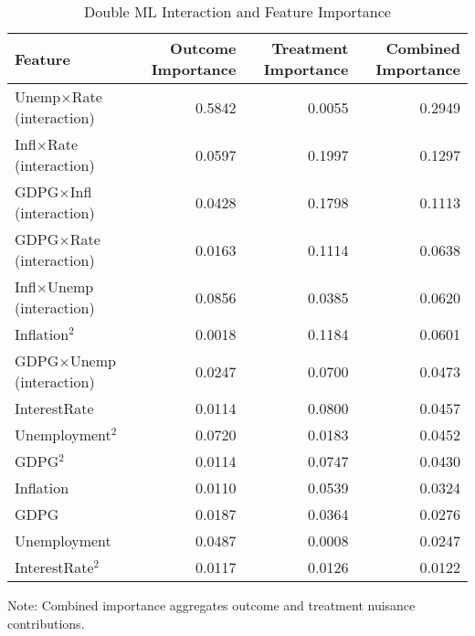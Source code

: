 \begin{table}[htbp]
  \centering
  \caption{Double ML Interaction and Feature Importance}
  \label{tab:dml_feature_importance}
  \small
  \begin{tabular}{lrrr}
    \toprule
    Feature & Outcome Importance & Treatment Importance & Combined Importance \\
    \midrule
    Unemp$\times$Rate (interaction) & 0.5842 & 0.0055 & 0.2949 \\
    Infl$\times$Rate (interaction) & 0.0597 & 0.1997 & 0.1297 \\
    GDPG$\times$Infl (interaction) & 0.0428 & 0.1798 & 0.1113 \\
    GDPG$\times$Rate (interaction) & 0.0163 & 0.1114 & 0.0638 \\
    Infl$\times$Unemp (interaction) & 0.0856 & 0.0385 & 0.0620 \\
    Inflation$^2$ & 0.0018 & 0.1184 & 0.0601 \\
    GDPG$\times$Unemp (interaction) & 0.0247 & 0.0700 & 0.0473 \\
    InterestRate & 0.0114 & 0.0800 & 0.0457 \\
    Unemployment$^2$ & 0.0720 & 0.0183 & 0.0452 \\
    GDPG$^2$ & 0.0114 & 0.0747 & 0.0430 \\
    Inflation & 0.0110 & 0.0539 & 0.0324 \\
    GDPG & 0.0187 & 0.0364 & 0.0276 \\
    Unemployment & 0.0487 & 0.0008 & 0.0247 \\
    InterestRate$^2$ & 0.0117 & 0.0126 & 0.0122 \\
    \bottomrule
  \end{tabular}
  \vspace{0.5em}
  {\footnotesize Note: Combined importance aggregates outcome and treatment nuisance contributions.}
\end{table}
